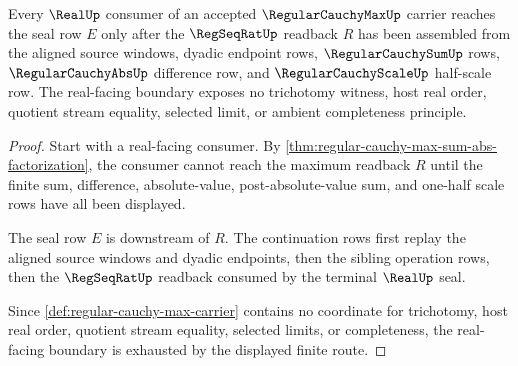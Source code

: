 \begin{theorem}
\label{thm:regular-cauchy-max-real-seal-boundary}
Every $\RealUp$ consumer of an accepted $\RegularCauchyMaxUp$ carrier reaches the seal row $E$ only after the $\RegSeqRatUp$ readback $R$ has been assembled from the aligned source windows, dyadic endpoint rows, $\RegularCauchySumUp$ rows, $\RegularCauchyAbsUp$ difference row, and $\RegularCauchyScaleUp$ half-scale row. The real-facing boundary exposes no trichotomy witness, host real order, quotient stream equality, selected limit, or ambient completeness principle.
\end{theorem}
\begin{proof}
Start with a real-facing consumer. By \autoref{thm:regular-cauchy-max-sum-abs-factorization}, the consumer cannot reach the maximum readback $R$ until the finite sum, difference, absolute-value, post-absolute-value sum, and one-half scale rows have all been displayed.

The seal row $E$ is downstream of $R$. The continuation rows first replay the aligned source windows and dyadic endpoints, then the sibling operation rows, then the $\RegSeqRatUp$ readback consumed by the terminal $\RealUp$ seal.

Since \autoref{def:regular-cauchy-max-carrier} contains no coordinate for trichotomy, host real order, quotient stream equality, selected limits, or completeness, the real-facing boundary is exhausted by the displayed finite route.
\end{proof}

